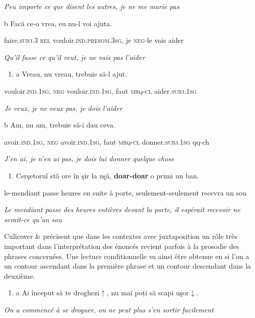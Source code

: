 {\itshape
Peu importe ce que disent les autres, je ne me marie pas}

  b  Facă  ce-o  vrea,  eu  nu-l  voi  ajuta.

    faire.\textsc{subj.3  rel}  vouloir.\textsc{ind.presom.3sg},  je  \textsc{neg-}le  vais  aider

{\itshape
  Qu'il fasse ce qu'il veut, je ne vais pas l'aider}


\begin{enumerate}
\item \label{bkm:Ref273710146}a  Vreau,  nu  vreau,  trebuie  să-l  ajut.


\end{enumerate}
vouloir.\textsc{ind.1sg},  \textsc{neg}  vouloir\textsc{.ind.1sg},  faut  \textsc{mrq-cl } aider.\textsc{subj.1sg}

{\itshape
Je veux, je ne veux pas, je dois l'aider}

  b  Am,  nu  am,  trebuie  să-i  dau  ceva.

    avoir.\textsc{ind.1sg},  \textsc{neg}  avoir\textsc{.ind.1sg},  faut  \textsc{mrq-cl } donner.\textsc{subj.1sg } qq-ch\textsc{ } 

{\itshape
J'en ai, je n'en ai pas, je dois lui donner quelque chose}


\begin{enumerate}
\item \label{bkm:Ref273710400}Cerşetorul  stă  ore  în  şir  la  uşă,  \textbf{doar-doar}  o primi  un  ban.


\end{enumerate}
  le-mendiant  passe  heures  en  suite  à  porte,  seulement-seulement  recevra  un  sou

{\itshape
Le mendiant passe des heures entières devant la porte, il espérait recevoir ne serait-ce qu'un sou}

Culicover \& \citet[480]{Jackendoff2005} précisent que dans les contextes avec juxtaposition un rôle très important dans l'interprétation des énoncés revient parfois à la prosodie des phrases concernées. Une lecture conditionnelle va ainsi être obtenue en  si l'on a un contour ascendant dans la première phrase et un contour descendant dans la deuxième. 


\begin{enumerate}
\item \label{bkm:Ref273716163}a  Ai început să te droghezi$\uparrow $, nu mai poți să scapi uşor$\downarrow $.


\end{enumerate}
{\itshape
On a commencé à se droguer, on ne peut plus s'en sortir facilement}

